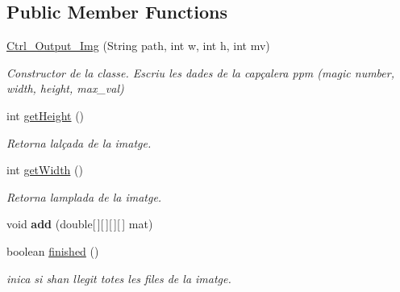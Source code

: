 \subsection*{Public Member Functions}
\begin{DoxyCompactItemize}
\item 
\hyperlink{classpersistencia_1_1output_1_1Ctrl__Output__Img_aa3f2948dd4645d8b121eedf30daa0c3f}{Ctrl\+\_\+\+Output\+\_\+\+Img} (String path, int w, int h, int mv)
\begin{DoxyCompactList}\small\item\em Constructor de la classe. Escriu les dades de la capçalera ppm (magic number, width, height, max\+\_\+val) \end{DoxyCompactList}\item 
int \hyperlink{classpersistencia_1_1output_1_1Ctrl__Output__Img_a736bcf38410d875d9b4a17fd2a95cc4d}{get\+Height} ()
\begin{DoxyCompactList}\small\item\em Retorna l\textquotesingle{}alçada de la imatge. \end{DoxyCompactList}\item 
int \hyperlink{classpersistencia_1_1output_1_1Ctrl__Output__Img_ab6e88e466e6b7d7d847be2ac9c26c529}{get\+Width} ()
\begin{DoxyCompactList}\small\item\em Retorna l\textquotesingle{}amplada de la imatge. \end{DoxyCompactList}\item 
\mbox{\label{classpersistencia_1_1output_1_1Ctrl__Output__Img_a305a977f4d4b999cf65e14e7106b6c5e}} 
void {\bfseries add} (double\mbox{[}$\,$\mbox{]}\mbox{[}$\,$\mbox{]}\mbox{[}$\,$\mbox{]}\mbox{[}$\,$\mbox{]} mat)
\item 
\mbox{\label{classpersistencia_1_1output_1_1Ctrl__Output__Img_a365d043ee5bd08c4e470bff468773552}} 
boolean \hyperlink{classpersistencia_1_1output_1_1Ctrl__Output__Img_a365d043ee5bd08c4e470bff468773552}{finished} ()
\begin{DoxyCompactList}\small\item\em inica si s\textquotesingle{}han llegit totes les files de la imatge. \end{DoxyCompactList}\end{DoxyCompactItemize}
